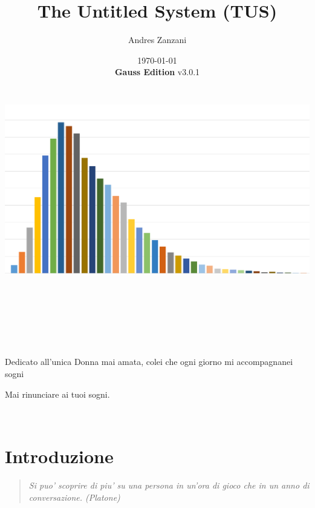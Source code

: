 \documentclass[a4paper,11pt,twoside,openany]{book}
\begin{document}
\title{The Untitled System (TUS)}
\date{\today\\\textbf{Gauss Edition} v3.0.1\\\includegraphics[width=6.85139in,height=3.79514in]{copertina.png}}
\author{Andres Zanzani}
\maketitle
\thispagestyle{empty}

\newpage~\newpage~




Dedicato all'unica Donna mai amata, colei che ogni giorno mi accompagnanei sogni

Mai rinunciare ai tuoi sogni.
\thispagestyle{empty}

\newpage~\thispagestyle{empty}%

\setcounter{page}{0}

\begin{multicols}{2}
\tableofcontents{}
\end{multicols}

\pagebreak{}

\section{Introduzione}

\pagestyle{plain} 
\begin{quote}\textit{Si puo' scoprire di piu' su una persona in un'ora di gioco che in un anno di conversazione. (Platone)
}\end{quote}
\end{document}
